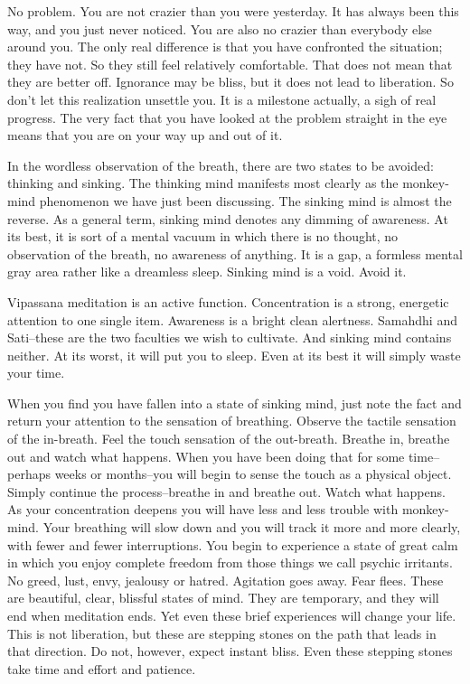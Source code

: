 No problem. You are not crazier than you were yesterday. It has always been this
way, and you just never noticed. You are also no crazier than everybody else
around you. The only real difference is that you have confronted the situation;
they have not. So they still feel relatively comfortable. That does not mean
that they are better off. Ignorance may be bliss, but it does not lead to
liberation. So don't let this realization unsettle you. It is a milestone
actually, a sigh of real progress. The very fact that you have looked at the
problem straight in the eye means that you are on your way up and out of it.

In the wordless observation of the breath, there are two states to be avoided:
thinking and sinking. The thinking mind manifests most clearly as the
monkey-mind phenomenon we have just been discussing. The sinking mind is almost
the reverse. As a general term, sinking mind denotes any dimming of awareness.
At its best, it is sort of a mental vacuum in which there is no thought, no
observation of the breath, no awareness of anything. It is a gap, a formless
mental gray area rather like a dreamless sleep. Sinking mind is a void. Avoid
it.

Vipassana meditation is an active function. Concentration is a strong, energetic
attention to one single item. Awareness is a bright clean alertness. Samahdhi
and Sati--these are the two faculties we wish to cultivate. And sinking mind
contains neither. At its worst, it will put you to sleep. Even at its best it
will simply waste your time.

When you find you have fallen into a state of sinking mind, just note the fact
and return your attention to the sensation of breathing. Observe the tactile
sensation of the in-breath. Feel the touch sensation of the out-breath. Breathe
in, breathe out and watch what happens. When you have been doing that for some
time--perhaps weeks or months--you will begin to sense the touch as a physical
object. Simply continue the process--breathe in and breathe out. Watch what
happens. As your concentration deepens you will have less and less trouble with
monkey-mind. Your breathing will slow down and you will track it more and more
clearly, with fewer and fewer interruptions. You begin to experience a state of
great calm in which you enjoy complete freedom from those things we call psychic
irritants. No greed, lust, envy, jealousy or hatred. Agitation goes away. Fear
flees. These are beautiful, clear, blissful states of mind. They are temporary,
and they will end when meditation ends. Yet even these brief experiences will
change your life. This is not liberation, but these are stepping stones on the
path that leads in that direction. Do not, however, expect instant bliss. Even
these stepping stones take time and effort and patience.

